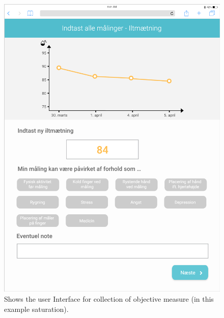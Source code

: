 \begin{figure}[h]
  \centering
  \begin{minipage}[b]{0.45\textwidth}
    \includegraphics[width=\textwidth]{images/study2/collectionObj.png}
    \caption{Shows the user Interface for collection of objective measure (in this example saturation).}
    \label{fig:colObj}
  \end{minipage}
  \hfill
  \begin{minipage}[b]{0.45\textwidth}

\end{minipage}
\end{figure}
